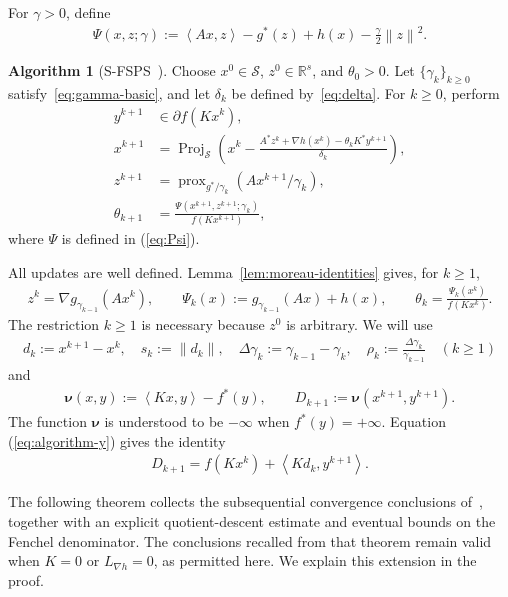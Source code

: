 \documentclass[9pt]{article}
\numberwithin{equation}{section}
\theoremstyle{definition}
\newtheorem{algorithm}[theorem]{Algorithm}
\theoremstyle{remark}
\newcommand{\R}{\mathbb R}
\newcommand{\Sset}{\mathcal S}
\newcommand{\norm}[1]{\left\lVert #1\right\rVert}
\newcommand{\ip}[2]{\left\langle #1,#2\right\rangle}
\newcommand{\nuf}{\boldsymbol\nu}
\DeclareMathOperator{\prox}{prox}
\DeclareMathOperator{\proj}{Proj}
\begin{document}
\noindent For $\gamma>0$, define
\begin{eqnarray}\label{eq:Psi}
 \Psi(x,z;\gamma):=\ip{Ax}{z}-g^*(z)+h(x)-\frac\gamma2\norm z^2.
\end{eqnarray}
\begin{algorithm}[S-FSPS~\cite{BotLiTao2025}]\label{alg:SFSPS}
Choose $x^0\in\Sset$, $z^0\in\R^s$, and $\theta_0>0$. Let $\{\gamma_k\}_{k\ge 0}$ satisfy~\eqref{eq:gamma-basic}, and let
$\delta_k$ be defined by~\eqref{eq:delta}. For $k\geq0$,
perform
\begin{align}
 y^{k+1}&\in\partial f(Kx^k),\label{eq:algorithm-y}\\
 x^{k+1}&=\proj_{\Sset}\!\left(x^k-
 \frac{A^*z^k+\nabla h(x^k)-\theta_kK^*y^{k+1}}{\delta_k}\right),
 \label{eq:algorithm-x}\\
 z^{k+1}&=\prox_{g^*/\gamma_k}(Ax^{k+1}/\gamma_k),
 \label{eq:algorithm-z}\\
 \theta_{k+1}&=\frac{\Psi(x^{k+1},z^{k+1};\gamma_k)}{f(Kx^{k+1})},
 \label{eq:algorithm-theta}
\end{align}
where $\Psi$ is defined in (\ref{eq:Psi}).
\end{algorithm}
All updates are well defined. Lemma~\ref{lem:moreau-identities} gives,
for $k\geq1$,
\begin{eqnarray*}\label{eq:moreau-recursion}
z^k=\nabla g_{\gamma_{k-1}}(Ax^k),\qquad
 \Psi_k(x):=g_{\gamma_{k-1}}(Ax)+h(x),\qquad
 \theta_k=\frac{\Psi_k(x^k)}{f(Kx^k)}.
\end{eqnarray*}
The restriction $k\geq1$ is necessary because $z^0$ is arbitrary.
We will use
\begin{eqnarray*}\label{eq:increments}
d_k:=x^{k+1}-x^k,\quad s_k:=\norm{d_k},\quad
 \Delta\gamma_k:=\gamma_{k-1}-\gamma_k,\quad
 \rho_k:=\frac{\Delta\gamma_k}{\gamma_{k-1}}\quad(k\geq1)
\end{eqnarray*}
and
\begin{eqnarray*}\label{eq:D-definition}
\nuf(x,y):=\ip{Kx}{y}-f^*(y),\qquad
 D_{k+1}:=\nuf(x^{k+1},y^{k+1}).
\end{eqnarray*}
The function $\nuf$ is understood to be $-\infty$ when $f^*(y)=+\infty$.
Equation (\ref{eq:algorithm-y}) gives the identity
\begin{eqnarray}\label{eq:Dhat}
 D_{k+1}=f(Kx^k)+\ip{Kd_k}{y^{k+1}}.
\end{eqnarray}




The following theorem collects the subsequential convergence
conclusions of~\cite[Theorem~2.6]{Tao2026}, together with an explicit
quotient-descent estimate and eventual bounds on the Fenchel denominator.
The conclusions recalled from that theorem remain valid when $K=0$
or $L_{\nabla h}=0$, as permitted here. We explain this extension
in the proof.
\end{document}
